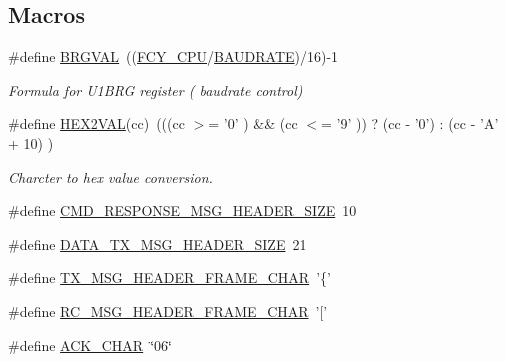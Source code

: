 \subsection*{Macros}
\begin{DoxyCompactItemize}
\item 
\#define \hyperlink{a00030_aca346e181d2ffc089e22e75736a6ff63}{B\+R\+G\+V\+A\+L}~((\hyperlink{a00072_a573f918b7668f8f2b59ac8adeae633a4}{F\+C\+Y\+\_\+\+C\+P\+U}/\hyperlink{a00031_a734bbab06e1a9fd2e5522db0221ff6e3}{B\+A\+U\+D\+R\+A\+T\+E})/16)-\/1
\begin{DoxyCompactList}\small\item\em Formula for U1\+B\+R\+G register ( baudrate control) \end{DoxyCompactList}\item 
\#define \hyperlink{a00030_a428b04d2e2f2da2ea031a6c731660a71}{H\+E\+X2\+V\+A\+L}(cc)~(((cc $>$= '0' ) \&\& (cc $<$= '9' )) ? (cc -\/ '0') \+: (cc -\/ 'A' + 10) )
\begin{DoxyCompactList}\small\item\em Charcter to hex value conversion. \end{DoxyCompactList}\item 
\#define \hyperlink{a00030_a70cf18090d97bf40a74a6ff7fd56d888}{C\+M\+D\+\_\+\+R\+E\+S\+P\+O\+N\+S\+E\+\_\+\+M\+S\+G\+\_\+\+H\+E\+A\+D\+E\+R\+\_\+\+S\+I\+Z\+E}~10
\item 
\#define \hyperlink{a00030_a7704c8abe93ef4188dd1562167bdbe63}{D\+A\+T\+A\+\_\+\+T\+X\+\_\+\+M\+S\+G\+\_\+\+H\+E\+A\+D\+E\+R\+\_\+\+S\+I\+Z\+E}~21
\item 
\#define \hyperlink{a00030_ae744e762e849a4701bf982655b5dc2db}{T\+X\+\_\+\+M\+S\+G\+\_\+\+H\+E\+A\+D\+E\+R\+\_\+\+F\+R\+A\+M\+E\+\_\+\+C\+H\+A\+R}~'\{'
\item 
\#define \hyperlink{a00030_a5470c21188de014a742af7a64aeb23a0}{R\+C\+\_\+\+M\+S\+G\+\_\+\+H\+E\+A\+D\+E\+R\+\_\+\+F\+R\+A\+M\+E\+\_\+\+C\+H\+A\+R}~'\mbox{[}'
\item 
\#define \hyperlink{a00030_a2c59f95209427bfe2c53a30515cfbeda}{A\+C\+K\+\_\+\+C\+H\+A\+R}~\char`\"{}06\char`\"{}
\end{DoxyCompactItemize}
